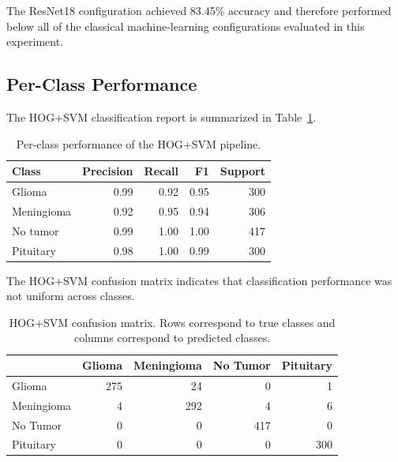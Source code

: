 \documentclass[11pt,a4paper]{article}
\begin{document}
The ResNet18 configuration achieved 83.45\% accuracy and therefore performed below all of the classical machine-learning configurations evaluated in this experiment.

\subsection{Per-Class Performance}

The HOG+SVM classification report is summarized in Table~\ref{tab:hog_report}.

\begin{table}[H]
\centering
\caption{Per-class performance of the HOG+SVM pipeline.}
\label{tab:hog_report}
\begin{tabular}{lrrrr}
\toprule
\textbf{Class}
& \textbf{Precision}
& \textbf{Recall}
& \textbf{F1}
& \textbf{Support} \\
\midrule
Glioma
& 0.99
& 0.92
& 0.95
& 300 \\

Meningioma
& 0.92
& 0.95
& 0.94
& 306 \\

No tumor
& 0.99
& 1.00
& 1.00
& 417 \\

Pituitary
& 0.98
& 1.00
& 0.99
& 300 \\

\bottomrule
\end{tabular}
\end{table}

The HOG+SVM confusion matrix indicates that classification performance was not uniform across classes.

\begin{table}[H]
\centering
\caption{HOG+SVM confusion matrix. Rows correspond to true classes and columns correspond to predicted classes.}
\label{tab:hog_cm}
\begin{tabular}{lrrrr}
\toprule
 & Glioma & Meningioma & No Tumor & Pituitary \\
\midrule
Glioma
& 275 & 24 & 0 & 1 \\

Meningioma
& 4 & 292 & 4 & 6 \\

No Tumor
& 0 & 0 & 417 & 0 \\

Pituitary
& 0 & 0 & 0 & 300 \\

\bottomrule
\end{tabular}
\end{table}
\end{document}
